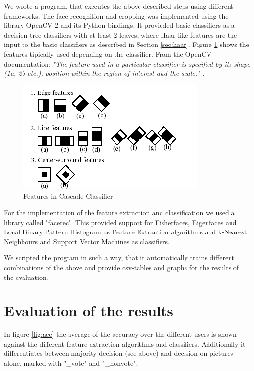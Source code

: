 \documentclass{report}
\begin{document}
We wrote a program, that executes the above described steps using different frameworks.
The face recognition and cropping was implemented using the library OpenCV 2\cite{opencv} and its Python bindings.
It provieded basic classifiers as a decision-tree classifiers with at least 2 leaves, where Haar-like features are the input to the basic classifiers as described in Section \ref{sec:haar}. Figure \ref{fig:haar-feats} shows the features tipically used depending on the classifier. From the OpenCV documentation:
\emph{"The feature used in a particular classifier is specified by its shape (1a, 2b etc.), position within the region of interest and the scale."} \cite{haar-opencv-doc}.

\begin{figure}[!htb]
  \center
  \includegraphics[scale=0.5]{images/haarfeatures.png}
  \caption{Features in Cascade Classifier \cite{haar-opencv-doc}}
  \label{fig:haar-feats}
\end{figure}

For the implementation of the feature extraction and classification we used a library called "facerec"\cite{facerec-lib}.
This provided support for Fisherfaces, Eigenfaces and Local Binary Pattern Histogram as Feature Extraction algorithms and k-Nearest Neighbours and Support Vector Machines as classifiers.

We scripted the program in such a way, that it automatically trains different combinations of the above and provide csv-tables and graphs for the results of the evaluation.

\section{Evaluation of the results}

In figure \ref{fig:acc} the average of the accuracy over the different users is shown against the different feature extraction algorithms and classifiers.
Additionally it differentiates between majority decision (see above) and decision on pictures alone, marked with "\_vote" and "\_nonvote".
\end{document}
